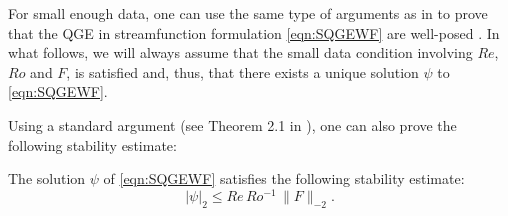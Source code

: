 For small enough data, one can use the same type of arguments as in
\cite{Girault79,Girault86} to prove that the QGE in streamfunction formulation
\eqref{eqn:SQGEWF} are well-posed \cite{Barcilon,Ipatova10,Wolansky88}.  In what
follows, we will always assume that the small data condition involving $Re$,
$Ro$ and $F$, is satisfied and, thus, that there exists a unique solution $\psi$
to \eqref{eqn:SQGEWF}.

Using a standard argument (see Theorem 2.1 in \cite{Cayco86}), one can also
prove the following stability estimate:
\begin{thm} \label{thm:stability_sqge}
  The solution $\psi$ of \eqref{eqn:SQGEWF} satisfies the following stability
  estimate:
  \begin{equation}
   |\psi|_2
   \le Re \, Ro^{-1} \, \| F \|_{-2} .
   \label{eqn:stability_sqge}
  \end{equation}
\end{thm}
